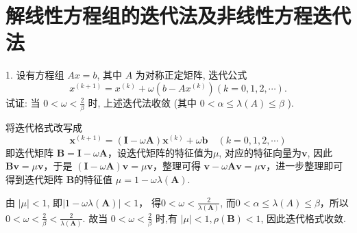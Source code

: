 \newpage
\section{解线性方程组的迭代法及非线性方程迭代法}


\begin{tcolorbox}[breakable,enhanced,arc=0mm,outer arc=0mm,
		boxrule=0pt,toprule=1pt,leftrule=0pt,bottomrule=1pt, rightrule=0pt,left=0.2cm,right=0.2cm,
		titlerule=0.5em,toptitle=0.1cm,bottomtitle=-0.1cm,top=0.2cm,
		colframe=white!10!biru,colback=white!90!biru,coltitle=white,
            coltext=black,title =2024-04, title style={white!10!biru}, before skip=8pt, after skip=8pt,before upper=\hspace{2em},
		fonttitle=\bfseries,fontupper=\normalsize]
  
1. 设有方程组 $ A x=b $, 其中 $ A $ 为对称正定矩阵, 迭代公式
$$
x^{(k+1)}=x^{(k)}+\omega\left(b-A x^{(k)}\right)(k=0,1,2, \cdots) .
$$
试证: 当 $ 0<\omega<\frac{2}{\beta} $ 时, 上述迭代法收敛
 (其中  $0<\alpha \leq \lambda(A) \leq \beta$  ). 
\tcblower

将迭代格式改写成
$$
\boldsymbol{x}^{(k+1)}=(\boldsymbol{I}-\omega \boldsymbol{A}) \boldsymbol{x}^{(k)}+\omega \boldsymbol{b} \quad(k=0,1,2, \cdots)
$$
即迭代矩阵 $ \boldsymbol{B}=\boldsymbol{I}-\omega \boldsymbol{A} $，设迭代矩阵的特征值为$\mu$, 对应的特征向量为$\boldsymbol{v}$, 因此 $ \boldsymbol{Bv} = \mu \boldsymbol{v} $，于是 $ (\boldsymbol{I}-\omega \boldsymbol{A})\boldsymbol{v} = \mu \boldsymbol{v} $，整理可得 $ \boldsymbol{v} - \omega \boldsymbol{A}\boldsymbol{v} = \mu \boldsymbol{v} $，进一步整理即可得到迭代矩阵 $ \boldsymbol{B}$的特征值 $ \mu = 1 - \omega \lambda(\boldsymbol{A}) $.

由 $ |\mu|<1$, 即$|1-{\omega \lambda}(\boldsymbol{A})|<1 $， 得$0<\omega<\frac{2}{\lambda(\boldsymbol{A})}$,
而$0<\alpha \leq \lambda(A) \leq \beta$，所以$ 0<\omega<\frac{2}{\beta}<\frac{2}{\lambda(\boldsymbol{A})}$.
故当 $0<\omega<\frac{2}{\beta} $ 时,有 $|\mu|<1, \rho(\boldsymbol{B})<1 $, 因此迭代格式收敛.
\end{tcolorbox}


